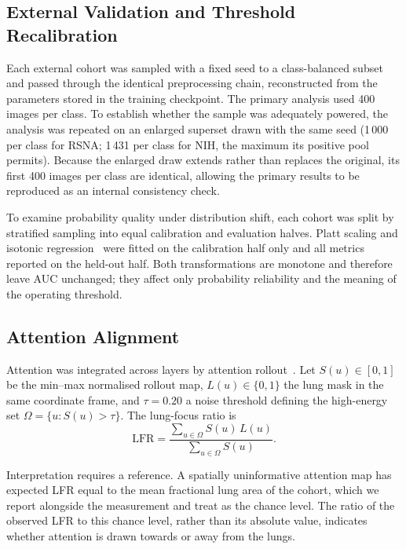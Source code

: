\documentclass[journal,twoside,web]{ieeecolor}
\begin{document}
\subsection{External Validation and Threshold Recalibration}
\label{sec:external}

Each external cohort was sampled with a fixed seed to a class-balanced subset and passed through the identical preprocessing chain, reconstructed from the parameters stored in the training checkpoint. The primary analysis used 400 images per class. To establish whether the sample was adequately powered, the analysis was repeated on an enlarged superset drawn with the same seed (1\,000 per class for RSNA; 1\,431 per class for NIH, the maximum its positive pool permits). Because the enlarged draw extends rather than replaces the original, its first 400 images per class are identical, allowing the primary results to be reproduced as an internal consistency check.

To examine probability quality under distribution shift, each cohort was split by stratified sampling into equal calibration and evaluation halves. Platt scaling and isotonic regression~\cite{guo2017} were fitted on the calibration half only and all metrics reported on the held-out half. Both transformations are monotone and therefore leave AUC unchanged; they affect only probability reliability and the meaning of the operating threshold.

\subsection{Attention Alignment}
\label{sec:lfr}

Attention was integrated across layers by attention rollout~\cite{abnar2020}. Let $S(u)\in[0,1]$ be the min--max normalised rollout map, $L(u)\in\{0,1\}$ the lung mask in the same coordinate frame, and $\tau=0.20$ a noise threshold defining the high-energy set $\Omega=\{u: S(u)>\tau\}$. The lung-focus ratio is
\begin{equation}
\mathrm{LFR}=\frac{\sum_{u\in\Omega}S(u)\,L(u)}{\sum_{u\in\Omega}S(u)}.
\label{eq:lfr}
\end{equation}

Interpretation requires a reference. A spatially uninformative attention map has expected LFR equal to the mean fractional lung area of the cohort, which we report alongside the measurement and treat as the chance level. The ratio of the observed LFR to this chance level, rather than its absolute value, indicates whether attention is drawn towards or away from the lungs.
\end{document}

